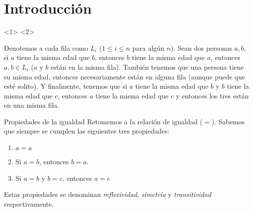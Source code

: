 \section{Introducción}
\begin{frame}
    <1>
    <2>
\end{frame}
\begin{frame}
    Denotemos a cada fila como $L_{i}$ ($1\leq i\leq n$ para algún $n$). Sean dos personas $a, b$, si $a$ tiene la misma edad que $b$, entonces $b$ tiene la misma edad que $a$, entonces $a, b\in L_{i}$ ($a$ y $b$ están en la misma fila). También tenemos que una persona tiene su misma edad, entonces necesariamente están en alguna fila (aunque puede que esté solito). Y finalmente, tenemos que si $a$ tiene la misma edad que $b$ y $b$ tiene la misma edad que $c$, entonces $a$ tiene la misma edad que $c$ y entonces los tres están en una misma fila.
\end{frame}
\begin{frame}{Propiedades de la igualdad}
    Retomemos a la relación de igualdad ($=$). Sabemos que siempre se cumplen las siguientes tres propiedades:
    \begin{enumerate}
        \item $a = a$
        \item Si $a = b$, entonces $b = a$.
        \item Si $a = b$ y $b = c$, entonces $a = c$
    \end{enumerate}
    Estas propiedades se denominan \emph{reflexividad}, \emph{simetría} y \emph{transitividad} respectivamente.
\end{frame}

